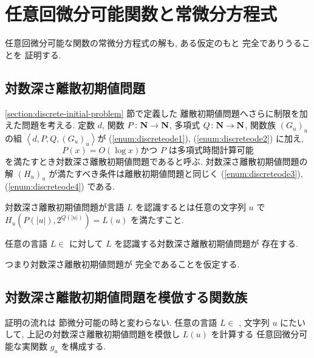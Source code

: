\section{任意回微分可能関数と常微分方程式}

 任意回微分可能な関数の常微分方程式の解も, ある仮定のもと \PSPACE 完全でありうることを
 証明する.

\subsection{対数深さ離散初期値問題}
  \ref{section:discrete-initial-problem} 節で定義した
  離散初期値問題へさらに制限を加えた問題を考える.
  定数 $d$, 関数 $P \colon \mathbf N \to \mathbf N$, 多項式 $Q \colon \mathbf N \to \mathbf N$, 
  関数族 $(G_u)_u$ の組 $\left< d, P, Q, (G_u)_u \right>$が
  (\ref{enum:discreteode1}), (\ref{enum:discreteode2}) に加え,
  \begin{equation}
   P(x) = O(\log x) \text{かつ $P$ は多項式時間計算可能}
  \end{equation}
  を満たすとき対数深さ離散初期値問題であると呼ぶ.
  対数深さ離散初期値問題の解 $(H_u)_u$ が満たすべき条件は離散初期値問題と同じく
  (\ref{enum:discreteode3}), (\ref{enum:discreteode4}) である.

  対数深さ離散初期値問題が言語 $L$ を認識するとは任意の文字列 $u$ で
  $H_u(P(|u|), 2^{Q(|u|)}) = L(u)$ を満たすこと.

 \begin{hypothesis}
  \label{Hypothesis}
  任意の言語 $L \in$ \PSPACE に対して $L$ を認識する対数深さ離散初期値問題が
  存在する.
 \end{hypothesis}

 つまり対数深さ離散初期値問題が \PSPACE 完全であることを仮定する. 

\subsection{対数深さ離散初期値問題を模倣する関数族}

 証明の流れは 節微分可能の時と変わらない.
 任意の言語 $L \in $ \PSPACE, 文字列 $u$ にたいして,
 上記の対数深さ離散初期値問題を模倣し $L(u)$ を計算する
 任意回微分可能な実関数 $g_u$ を構成する.

